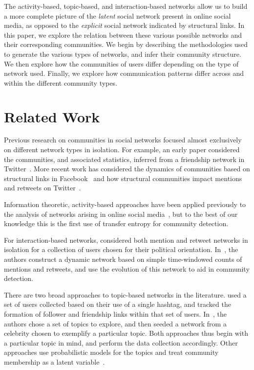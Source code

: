 The activity-based, topic-based, and interaction-based networks allow us to build a more complete picture of the \emph{latent} social network present in online social media, as opposed to the \emph{explicit} social network indicated by structural links. In this paper, we explore the relation between these various possible networks and their corresponding communities. We begin by describing the methodologies used to generate the various types of networks, and infer their community structure. We then explore how the communities of users differ depending on the type of network used. Finally, we explore how communication patterns differ across and within the different community types.

\section{Related Work}

Previous research on communities in social networks focused almost exclusively on different network types in isolation. For example, an early paper considered the communities, and associated statistics, inferred from a friendship network in Twitter~\cite{java2009we}. More recent work has considered the dynamics of communities based on structural links in Facebook~\cite{nguyen2011adaptive} and how structural communities impact mentions and retweets on Twitter~\cite{grabowicz2012social}.


Information theoretic, activity-based approaches have been applied previously to the analysis of networks arising in online social media~\cite{ver2012information,darmon2013detecting}, but to the best of our knowledge this is the first use of transfer entropy for community detection.

For interaction-based networks, \cite{conover2011political} considered both mention and retweet networks in isolation for a collection of users chosen for their political orientation. In~\cite{deitrick2013mutually}, the authors construct a dynamic network based on simple time-windowed counts of mentions and retweets, and use the evolution of this network to aid in community detection.

There are two broad approaches to topic-based networks in the literature. \cite{rossi2012conversation} used a set of users collected based on their use of a single hashtag, and tracked the formation of follower and friendship links within that set of users. In~\cite{lim2012following}, the authors chose a set of topics to explore, and then seeded a network from a celebrity chosen to exemplify a particular topic. Both approaches thus begin with a particular topic in mind, and perform the data collection accordingly. Other approaches use probabilistic models for the topics and treat community membership as a latent variable~\cite{yin2012latent}.

